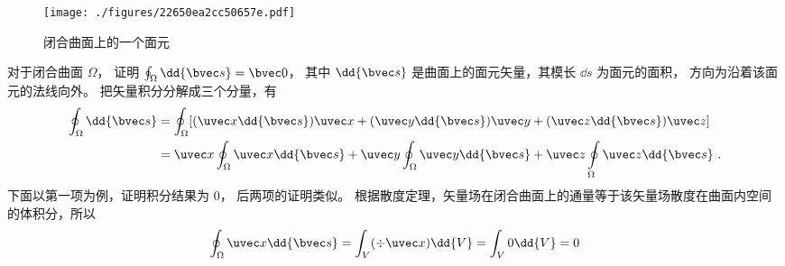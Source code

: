 

\begin{figure}[ht]
\centering
\texttt{[image: ./figures/22650ea2cc50657e.pdf]}
\caption{闭合曲面上的一个面元} \label{fig_CSI0_1}
\end{figure}

对于闭合曲面 $\Omega$，  证明 $\oint_\Omega  \dd{\bvec s} = \bvec 0$， 其中 $\dd{\bvec s}$ 是曲面上的面元矢量，其模长 $\dd{s}$ 为面元的面积，  方向为沿着该面元的法线向外。
把矢量积分分解成三个分量，有
\begin{equation}
\begin{aligned}
\oint_\Omega  \dd{\bvec s} & = \oint_\Omega  [(\uvec x \dd{\bvec s})\uvec x + (\uvec y \dd{\bvec s})\uvec y + (\uvec z \dd{\bvec s})\uvec z] \\
&= \uvec x\oint_\Omega  \uvec x \dd{\bvec s}  + \uvec y\oint_\Omega \uvec y \dd{\bvec s} + \uvec z\oint\limits_\Omega \uvec z \dd{\bvec s}~.
\end{aligned}
\end{equation}
下面以第一项为例，证明积分结果为 0， 后两项的证明类似。
根据散度定理，矢量场在闭合曲面上的通量等于该矢量场散度在曲面内空间的体积分，所以
\begin{equation}
\oint_\Omega  \uvec x \dd{\bvec s}  = \int_V (\div \uvec x) \dd{V}  = \int_V 0 \dd{V}  = 0
\end{equation}
